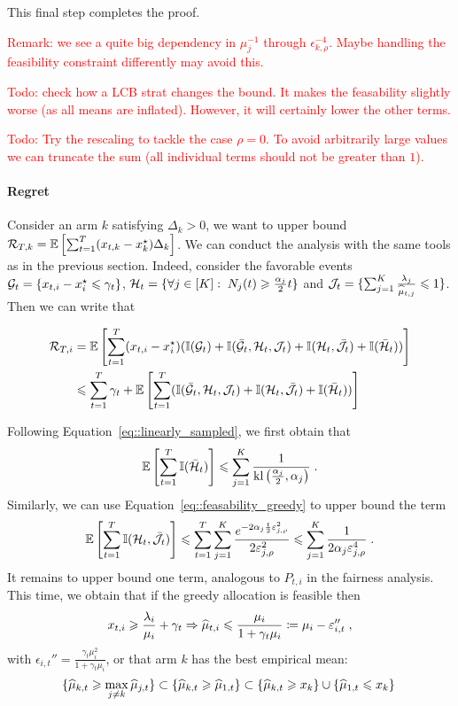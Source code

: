 This final step completes the proof. 

\textcolor{red}{Remark: we see a quite big dependency in $\mu_j^{-1}$ through $\epsilon_{k, \rho}^{-4}$. Maybe handling the feasibility constraint differently may avoid this.}

\textcolor{red}{Todo: check how a LCB strat changes the bound. It makes the feasability slightly worse (as all means are inflated). However, it will certainly lower the other terms.}

\textcolor{red}{Todo: Try the rescaling to tackle the case $\rho = 0$. To avoid arbitrarily large values we can truncate the sum (all individual terms should not be greater than $1$).}


\paragraph{Regret} Consider an arm $k$ satisfying $\Delta_k>0$, we want to upper bound $\mathcal{R}_{T, k} =  \mathbb{E}\left[\sum_{t=1}^T (x_{t, k} - x^\star_k)\Delta_k\right]$. We can conduct the analysis with the same tools as in the previous section. Indeed, consider the favorable events $\mathcal{G}_t = \{x_{t,i}-x_i^\star\leqslant \gamma_t \}$, $\mathcal{H}_t=\{\forall j \in [K]: \; N_j(t)\geqslant \frac{\alpha_j}{2} t \}$ and $\mathcal{J}_t = \{\sum_{j=1}^K \frac{\lambda_j}{\widehat{\mu}_{t,j}}\leqslant 1 \}$. Then we can write that 

\begin{align*}
\mathcal{R}_{T,i} &= \mathbb{E}\left[\sum_{t=1}^T (x_{t, i} - x^\star_i)(\mathbb{I}(\mathcal{G}_t)+\mathbb{I}(\bar {\mathcal{G}}_t, \mathcal{H}_t, \mathcal{J}_t)+ \mathbb{I}(\mathcal{H}_t, \bar {\mathcal{J}}_t)+ \mathbb{I}(\bar{\mathcal{H}}_t))\right] \\
& \leqslant \sum_{t=1}^T \gamma_t + \mathbb{E}\left[\sum_{t=1}^T (\mathbb{I}(\bar {\mathcal{G}}_t, \mathcal{H}_t, \mathcal{J}_t)+ \mathbb{I}(\mathcal{H}_t, \bar {\mathcal{J}}_t)+ \mathbb{I}(\bar{\mathcal{H}}_t))\right]
\end{align*}

Following Equation~\eqref{eq::linearly_sampled}, we first obtain that 
\[\mathbb{E}\left[\sum_{t=1}^T \mathbb{I}(\bar{\mathcal{H}}_t)\right] \leqslant \sum_{j=1}^K \frac{1}{\text{\normalfont kl}\left(\frac{\alpha_j}{2}, \alpha_j\right)} \;. \]
Similarly, we can use Equation~\eqref{eq::feasability_greedy} to upper bound the term
\[ \mathbb{E}\left[\sum_{t=1}^T \mathbb{I}(\mathcal{H}_t, \bar {\mathcal{J}}_t)\right] \leqslant \sum_{t=1}^T \sum_{j=1}^K \frac{e^{-2\alpha_j \frac{t}{2} \varepsilon_{j, \rho}^2}}{2\varepsilon_{j, \rho}^2}\leqslant \sum_{j=1}^K \frac{1}{2 \alpha_j \varepsilon_{j, \rho}^4} \;. \]
It remains to upper bound one term, analogous to $P_{t,i}$ in the fairness analysis. This time, we obtain that if the greedy allocation is feasible then
\[x_{t,i}\geqslant \frac{\lambda_i}{\mu_i}+ \gamma_t \Rightarrow \widehat{\mu}_{t,i} \leqslant \frac{\mu_i}{1+\gamma_t \mu_i} \coloneqq \mu_i - \varepsilon_{i,t}''\;, \]
with $\epsilon_{i,t}''=\frac{\gamma_t \mu_i^2}{1+\gamma_t \mu_i}$, or that arm $k$ has the best empirical mean: \[\{\widehat{\mu}_{k, t} \geqslant \max_{j\neq k} \widehat{\mu}_{j, t}\} \subset \{\widehat{\mu}_{k, t} \geqslant \widehat{\mu}_{1, t}\} \subset \{\widehat{\mu}_{k, t} \geqslant x_k \} \cup \{\widehat{\mu}_{1, t} \leqslant x_k  \}\; \]

